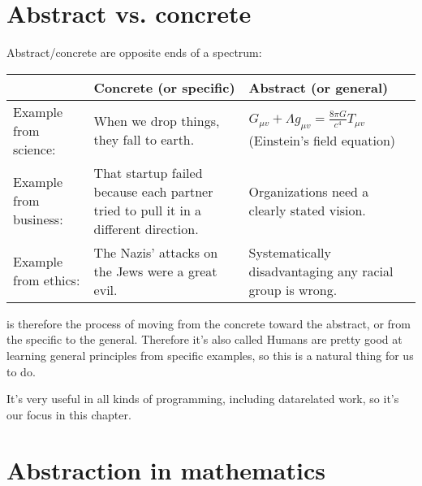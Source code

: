\documentclass[letterpaper,10pt,english]{sphinxmanual}
\begin{document}
\section{Abstract vs. concrete}
\label{\detokenize{chapter-7-abstraction:abstract-vs-concrete}}
Abstract/concrete are opposite ends of a spectrum:


\begin{savenotes}\sphinxattablestart
\centering
\begin{tabulary}{\linewidth}[t]{|T|T|T|}
\hline


&\sphinxstyletheadfamily 
Concrete (or specific)
&\sphinxstyletheadfamily 
Abstract (or general)
\\
\hline
Example from science:
&
When we drop things, they fall to earth.
&
\(G_{\mu v}+\Lambda g_{\mu v}=\frac{8\pi G}{c^4}T_{\mu v}\) (Einstein’s field equation)
\\
\hline
Example from business:
&
That startup failed because each partner tried to pull it in a different direction.
&
Organizations need a clearly stated vision.
\\
\hline
Example from ethics:
&
The Nazis’ attacks on the Jews were a great evil.
&
Systematically disadvantaging any racial group is wrong.
\\
\hline
\end{tabulary}
\par
\sphinxattableend\end{savenotes}

 is therefore the process of moving from the concrete toward the abstract, or from the specific to the general.  Therefore it’s also called   Humans are pretty good at learning general principles from specific examples, so this is a natural thing for us to do.

It’s very useful in all kinds of programming, including data\sphinxhyphen{}related work, so it’s our focus in this chapter.


\section{Abstraction in mathematics}
\label{\detokenize{chapter-7-abstraction:abstraction-in-mathematics}}
\end{document}
